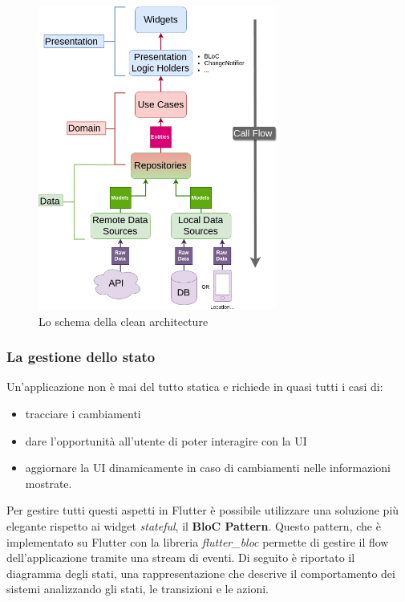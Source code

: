 \documentclass[12pt]{article}
\begin{document}
\begin{center}
\begin{figure}[htp]
    \centering
    \includegraphics[height=10cm]{diagrams/clean_architecture.png}
    \caption{Lo schema della clean architecture}
    \label{fig:clean_architecture}
\end{figure}
\end{center}

\subsubsection{La gestione dello stato}
Un’applicazione non è mai del tutto statica e richiede in quasi tutti i casi di:
\begin{itemize}
	\item tracciare i cambiamenti
	\item dare l’opportunità all’utente di poter interagire con la UI
	\item aggiornare la UI dinamicamente in caso di cambiamenti nelle informazioni mostrate.
\end{itemize}
Per gestire tutti questi aspetti in Flutter è possibile utilizzare una soluzione più elegante rispetto ai widget \emph{stateful}, il \textbf{BloC Pattern}. Questo pattern, che è implementato su Flutter con la libreria \emph{flutter\_bloc} permette di gestire il flow dell'applicazione tramite una stream di eventi.\clearpage
Di seguito è riportato il diagramma degli stati, una rappresentazione che descrive il comportamento dei sistemi analizzando gli stati, le transizioni e le azioni.
\end{document}
